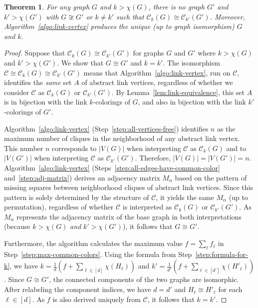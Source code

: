 \documentclass{amsart}
\theoremstyle{hypothesisstyle}
\newtheorem{theorem}{Theorem}[section]
\theoremstyle{definition}
\theoremstyle{remark}
\numberwithin{equation}{section}
\newcommand{\C}{\mathcal C}
\begin{document}
\begin{theorem}\label{thm:reconstruction}
    For any graph $G$ and $k>\chi(G)$, there is no graph $G'$ and $k'>\chi(G')$ with $G\not\cong G'$ or $k\ne k'$ such that $\C_k(G)\cong\C_{k'}(G')$. Moreover, Algorithm~\ref{algo:link-vertex} produces the unique (up to graph isomorphism) $G$ and $k$.
\end{theorem}

\begin{proof}
    Suppose that $\C_k(G)\cong\C_{k'}(G')$ for graphs $G$ and $G'$ where $k>\chi(G)$ and $k'>\chi(G')$. We show that $G\cong G'$ and $k=k'$. The isomorphism $\C\cong\C_k(G)\cong\C_{k'}(G')$ means that Algorithm~\ref{algo:link-vertex}, run on $\mathcal{C}$, identifies the \emph{same} set $A$ of abstract link vertices, regardless of whether we consider $\mathcal{C}$ as $\C_k(G)$ or $\C_{k'}(G')$. By Lemma~\ref{lem:link-equivalence}, this set $A$ is in bijection with the link $k$-colorings of $G$, and also in bijection with the link $k'$-colorings of $G'$. 
    
    Algorithm~\ref{algo:link-vertex} (Step~\ref{step:all-vertices-free}) identifies $n$ as the maximum number of cliques in the neighborhood of any abstract link vertex. This number $n$ corresponds to $|V(G)|$ when interpreting $\mathcal{C}$ as $\mathcal{C}_k(G)$ and to $|V(G')|$ when interpreting $\mathcal{C}$ as $\mathcal{C}_{k'}(G')$. Therefore, $|V(G)|=|V(G')|=n$. Algorithm~\ref{algo:link-vertex} (Steps~\ref{step:all-edges-have-common-color} and~\ref{step:adj-matrix}) derives an adjacency matrix $M_{\alpha}$ based on the pattern of missing squares between neighborhood cliques of abstract link vertices. Since this pattern is solely determined by the structure of $\C$, it yields the same $M_{\alpha}$ (up to permutation), regardless of whether $\mathcal{C}$ is interpreted as $\C_k(G)$ or $\C_{k'}(G')$. As $M_{\alpha}$   represents the adjacency matrix of the base graph in both interpretations (because $k>\chi(G)$ \emph{and} $k'>\chi(G')$), it follows that $G\cong G'$. 
    
    Furthermore, the algorithm calculates the maximum value $f=\sum_{\ell} f_{\ell}$ in Step~\ref{step:max-common-colors}. Using the formula from Step~\ref{step:formula-for-k}, we have $k=\frac{1}{d}\left(f + \sum_{\ell\in [d]}\chi(H_{\ell})\right)$ and $k'=\frac{1}{d'}\left(f + \sum_{\ell\in [d']}\chi(H'_{\ell})\right)$. Since $G\cong G'$, the connected components of the two graphs are isomorphic. After relabeling the component indices, we have $d=d'$ and $H_{\ell}\cong H'_{\ell}$ for each $\ell\in [d]$. As $f$ is also derived uniquely from $\C$, it follows that $k=k'$.
    \end{proof}
\end{document}

